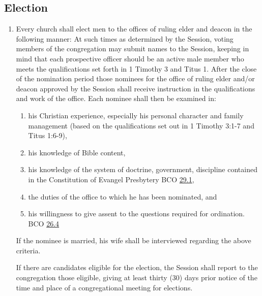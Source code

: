 \documentclass[
]{book}
\providecommand{\tightlist}{%
  \setlength{\itemsep}{0pt}\setlength{\parskip}{0pt}}
\begin{document}
\hypertarget{election}{%
\subsection*{\texorpdfstring{\protect\hypertarget{26}{\href{}{}} Election}{ Election}}\label{election}}

\begin{enumerate}
\def\labelenumi{\arabic{enumi}.}
\item
  Every church shall elect men to the offices of ruling elder and deacon in the following manner: At such times as determined by the Session, voting members of the congregation may submit names to the Session, keeping in mind that each prospective officer should be an active male member who meets the qualifications set forth in 1 Timothy 3 and Titus 1. After the close of the nomination period those nominees for the office of ruling elder and/or deacon approved by the Session shall receive instruction in the qualifications and work of the office. Each nominee shall then be examined in:

  \begin{enumerate}
  \def\labelenumii{\alph{enumii}.}
  \tightlist
  \item
    his Christian experience, especially his personal character and family management (based on the qualifications set out in 1 Timothy 3:1-7 and Titus 1:6-9),
  \item
    his knowledge of Bible content,
  \item
    his knowledge of the system of doctrine, government, discipline contained in the Constitution of Evangel Presbytery BCO \protect\hyperlink{29.1}{29.1},
  \item
    the duties of the office to which he has been nominated, and
  \item
    his willingness to give assent to the questions required for ordination. BCO \protect\hyperlink{26.4}{26.4}
  \end{enumerate}

  If the nominee is married, his wife shall be interviewed regarding the above criteria.

  If there are candidates eligible for the election, the Session shall report to the congregation those eligible, giving at least thirty (30) days prior notice of the time and place of a congregational meeting for elections.


\end{enumerate}
\end{document}
